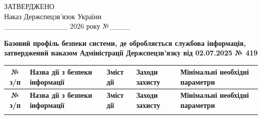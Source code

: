 \documentclass[10pt]{article}
\begin{document}
\begin{flushright}
ЗАТВЕРДЖЕНО\\
Наказ Держспецзв’язок України\\
\_\_\_\_\_\_\_\_\_\_\_\_ 2026 року №\_\_\_\_
\end{flushright}

\begin{center}
\textbf{\large Базовий профіль безпеки системи, де обробляється службова інформація, затверджений наказом Адміністрації Держспецзв’язку від 02.07.2025 № 419}
\end{center}

\footnotesize
\begin{longtable}{|c|>{\raggedright\arraybackslash}p{4cm}|>{\raggedright\arraybackslash}p{6cm}|>{\raggedright\arraybackslash}p{2cm}|>{\raggedright\arraybackslash}p{4cm}|}
\hline
\textbf{№ з/п} & \textbf{Назва дії з безпеки інформації} & \textbf{Зміст дії} & \textbf{Заходи захисту} & \textbf{Мінімальні необхідні параметри}\\
\hline
\endfirsthead

\hline
\textbf{№ з/п} & \textbf{Назва дії з безпеки інформації} & \textbf{Зміст дії} & \textbf{Заходи захисту} & \textbf{Мінімальні необхідні параметри}\\
\hline
\endhead

\hline
\endfoot

\hline
\endlastfoot


\end{longtable}
\end{document}
